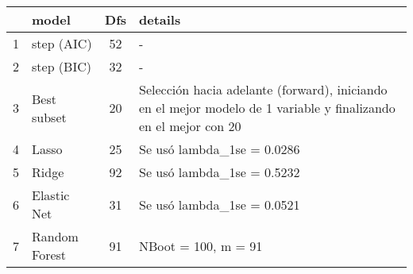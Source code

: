 \begin{tabular}{c|p{3cm}|c|p{6cm}}
\toprule
{} &          model &  Dfs &                                                                                                          details \\
\midrule
1 &     step (AIC) &   52 &                                                                                                                - \\
2 &     step (BIC) &   32 &                                                                                                                - \\
3 &    Best subset &   20 &  Selección hacia adelante (forward), iniciando en el mejor modelo de 1 variable y finalizando en el mejor con 20 \\
4 &          Lasso &   25 &                                                                                       Se usó lambda\_1se = 0.0286 \\
5 &          Ridge &   92 &                                                                                       Se usó lambda\_1se = 0.5232 \\
6 &    Elastic Net &   31 &                                                                                       Se usó lambda\_1se = 0.0521 \\
7 &  Random Forest &   91 &                                                                                              NBoot = 100, m = 91 \\
\bottomrule
\end{tabular}
